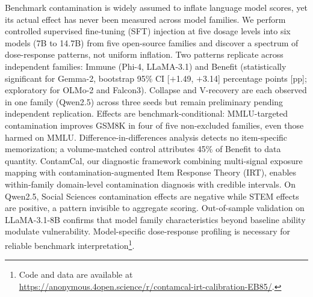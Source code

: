 Benchmark contamination is widely assumed to inflate language model scores, yet its actual effect has never been measured across model families. We perform controlled supervised fine-tuning (SFT) injection at five dosage levels into six models (7B to 14.7B) from five open-source families and discover a spectrum of dose-response patterns, not uniform inflation. Two patterns replicate across independent families: Immune (Phi-4, LLaMA-3.1) and Benefit (statistically significant for Gemma-2, bootstrap 95\% CI [$+$1.49, $+$3.14] percentage points [pp]; exploratory for OLMo-2 and Falcon3). Collapse and V-recovery are each observed in one family (Qwen2.5) across three seeds but remain preliminary pending independent replication. Effects are benchmark-conditional: MMLU-targeted contamination improves GSM8K in four of five non-excluded families, even those harmed on MMLU. Difference-in-differences analysis detects no item-specific memorization; a volume-matched control attributes 45\% of Benefit to data quantity. ContamCal, our diagnostic framework combining multi-signal exposure mapping with contamination-augmented Item Response Theory (IRT), enables within-family domain-level contamination diagnosis with credible intervals. On Qwen2.5, Social Sciences contamination effects are negative while STEM effects are positive, a pattern invisible to aggregate scoring. Out-of-sample validation on LLaMA-3.1-8B confirms that model family characteristics beyond baseline ability modulate vulnerability. Model-specific dose-response profiling is necessary for reliable benchmark interpretation\footnote{Code and data are available at \url{https://anonymous.4open.science/r/contamcal-irt-calibration-EB85/}.}.
